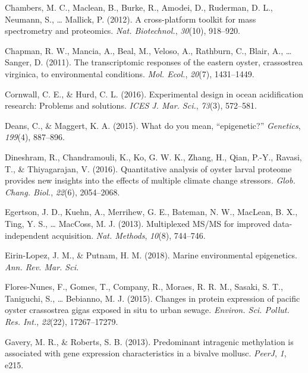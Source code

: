 \documentclass [11pt, proquest] {uwthesis}[2015/03/03]
\newlength{\cslhangindent}
\newenvironment{CSLReferences}%
{\setlength{\parindent}{0pt}%
\everypar{\setlength{\hangindent}{\cslhangindent}}\ignorespaces}%
{\par}
\begin{document}
\begin{CSLReferences}{1}{0}
\leavevmode\hypertarget{ref-Chambers2012}{}%
Chambers, M. C., Maclean, B., Burke, R., Amodei, D., Ruderman, D. L., Neumann, S., \ldots{} Mallick, P. (2012). A cross-platform toolkit for mass spectrometry and proteomics. \emph{Nat. Biotechnol.}, \emph{30}(10), 918--920.

\leavevmode\hypertarget{ref-Chapman2011}{}%
Chapman, R. W., Mancia, A., Beal, M., Veloso, A., Rathburn, C., Blair, A., \ldots{} Sanger, D. (2011). The transcriptomic responses of the eastern oyster, crassostrea virginica, to environmental conditions. \emph{Mol. Ecol.}, \emph{20}(7), 1431--1449.

\leavevmode\hypertarget{ref-Cornwall2016}{}%
Cornwall, C. E., \& Hurd, C. L. (2016). Experimental design in ocean acidification research: Problems and solutions. \emph{ICES J. Mar. Sci.}, \emph{73}(3), 572--581.

\leavevmode\hypertarget{ref-Deans2015}{}%
Deans, C., \& Maggert, K. A. (2015). What do you mean, {``epigenetic?''} \emph{Genetics}, \emph{199}(4), 887--896.

\leavevmode\hypertarget{ref-Dineshram2016}{}%
Dineshram, R., Chandramouli, K., Ko, G. W. K., Zhang, H., Qian, P.-Y., Ravasi, T., \& Thiyagarajan, V. (2016). Quantitative analysis of oyster larval proteome provides new insights into the effects of multiple climate change stressors. \emph{Glob. Chang. Biol.}, \emph{22}(6), 2054--2068.

\leavevmode\hypertarget{ref-Egertson2013}{}%
Egertson, J. D., Kuehn, A., Merrihew, G. E., Bateman, N. W., MacLean, B. X., Ting, Y. S., \ldots{} MacCoss, M. J. (2013). Multiplexed {MS/MS} for improved data-independent acquisition. \emph{Nat. Methods}, \emph{10}(8), 744--746.

\leavevmode\hypertarget{ref-Eirin-Lopez2018}{}%
Eirin-Lopez, J. M., \& Putnam, H. M. (2018). Marine environmental epigenetics. \emph{Ann. Rev. Mar. Sci.}

\leavevmode\hypertarget{ref-Flores-Nunes2015}{}%
Flores-Nunes, F., Gomes, T., Company, R., Moraes, R. R. M., Sasaki, S. T., Taniguchi, S., \ldots{} Bebianno, M. J. (2015). Changes in protein expression of pacific oyster crassostrea gigas exposed in situ to urban sewage. \emph{Environ. Sci. Pollut. Res. Int.}, \emph{22}(22), 17267--17279.

\leavevmode\hypertarget{ref-Gavery2013}{}%
Gavery, M. R., \& Roberts, S. B. (2013). Predominant intragenic methylation is associated with gene expression characteristics in a bivalve mollusc. \emph{PeerJ}, \emph{1}, e215.


\end{CSLReferences}
\end{document}
